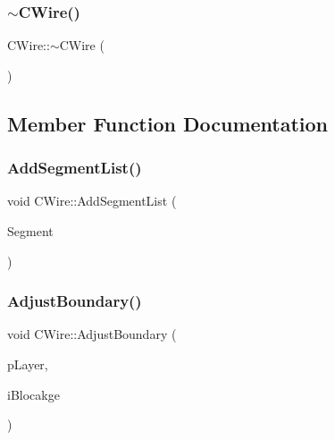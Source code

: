 \mbox{\label{classCWire_add9cbb4215373042a505db6330fbcb6c}} 
\subsubsection{\texorpdfstring{$\sim$CWire()}{~CWire()}}
{\footnotesize\ttfamily C\+Wire\+::$\sim$\+C\+Wire (\begin{DoxyParamCaption}{ }\end{DoxyParamCaption})\hspace{0.3cm}{\ttfamily [virtual]}}



\subsection{Member Function Documentation}
\mbox{\label{classCWire_a4e6880d10696889c8f5f65bc628984c5}} 
\subsubsection{\texorpdfstring{AddSegmentList()}{AddSegmentList()}}
{\footnotesize\ttfamily void C\+Wire\+::\+Add\+Segment\+List (\begin{DoxyParamCaption}\item[{vector$<$ \mbox{\hyperlink{classCSegment}{C\+Segment}} $\ast$ $>$}]{Segment }\end{DoxyParamCaption})}

\mbox{\label{classCWire_a36dd73e309fe16428df29220bc161d0e}} 
\subsubsection{\texorpdfstring{AdjustBoundary()}{AdjustBoundary()}}
{\footnotesize\ttfamily void C\+Wire\+::\+Adjust\+Boundary (\begin{DoxyParamCaption}\item[{\mbox{\hyperlink{classCLayer}{C\+Layer}} $\ast$}]{p\+Layer,  }\item[{int}]{i\+Blocakge }\end{DoxyParamCaption})}

